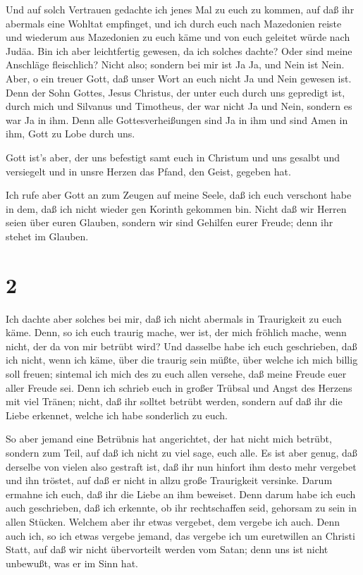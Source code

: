  Und auf solch Vertrauen gedachte ich jenes Mal zu euch zu
kommen, auf daß ihr abermals eine Wohltat empfinget,  und
ich durch euch nach Mazedonien reiste und wiederum aus Mazedonien zu
euch käme und von euch geleitet würde nach Judäa.  Bin ich
aber leichtfertig gewesen, da ich solches dachte? Oder sind meine
Anschläge fleischlich? Nicht also; sondern bei mir ist Ja Ja, und Nein
ist Nein.  Aber, o ein treuer Gott, daß unser Wort an euch
nicht Ja und Nein gewesen ist.  Denn der Sohn Gottes, Jesus
Christus, der unter euch durch uns gepredigt ist, durch mich und
Silvanus und Timotheus, der war nicht Ja und Nein, sondern es war Ja in
ihm.  Denn alle Gottesverheißungen sind Ja in ihm und sind
Amen in ihm, Gott zu Lobe durch uns.

 Gott ist's aber, der uns befestigt samt euch in Christum
und uns gesalbt  und versiegelt und in unsre Herzen das
Pfand, den Geist, gegeben hat.

 Ich rufe aber Gott an zum Zeugen auf meine Seele, daß ich
euch verschont habe in dem, daß ich nicht wieder gen Korinth gekommen
bin.  Nicht daß wir Herren seien über euren Glauben,
sondern wir sind Gehilfen eurer Freude; denn ihr stehet im Glauben.

\hypertarget{section-1}{%
\section{2}\label{section-1}}

 Ich dachte aber solches bei mir, daß ich nicht abermals in
Traurigkeit zu euch käme.  Denn, so ich euch traurig mache,
wer ist, der mich fröhlich mache, wenn nicht, der da von mir betrübt
wird?  Und dasselbe habe ich euch geschrieben, daß ich
nicht, wenn ich käme, über die traurig sein müßte, über welche ich mich
billig soll freuen; sintemal ich mich des zu euch allen versehe, daß
meine Freude euer aller Freude sei.  Denn ich schrieb euch
in großer Trübsal und Angst des Herzens mit viel Tränen; nicht, daß ihr
solltet betrübt werden, sondern auf daß ihr die Liebe erkennet, welche
ich habe sonderlich zu euch.

 So aber jemand eine Betrübnis hat angerichtet, der hat
nicht mich betrübt, sondern zum Teil, auf daß ich nicht zu viel sage,
euch alle.  Es ist aber genug, daß derselbe von vielen also
gestraft ist,  daß ihr nun hinfort ihm desto mehr vergebet
und ihn tröstet, auf daß er nicht in allzu große Traurigkeit versinke.
 Darum ermahne ich euch, daß ihr die Liebe an ihm beweiset.
 Denn darum habe ich euch auch geschrieben, daß ich
erkennte, ob ihr rechtschaffen seid, gehorsam zu sein in allen Stücken.
 Welchem aber ihr etwas vergebet, dem vergebe ich auch.
Denn auch ich, so ich etwas vergebe jemand, das vergebe ich um
euretwillen an Christi Statt,  auf daß wir nicht
übervorteilt werden vom Satan; denn uns ist nicht unbewußt, was er im
Sinn hat.


